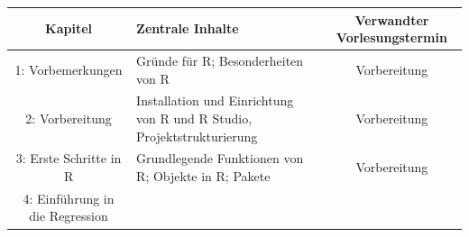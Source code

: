 \documentclass[]{book}
\begin{document}
\begin{longtable}[]{@{}clc@{}}
\toprule
\begin{minipage}[b]{0.10\columnwidth}\centering\strut
Kapitel\strut
\end{minipage} & \begin{minipage}[b]{0.24\columnwidth}\raggedright\strut
Zentrale Inhalte\strut
\end{minipage} & \begin{minipage}[b]{0.38\columnwidth}\centering\strut
Verwandter Vorlesungstermin\strut
\end{minipage}\tabularnewline
\midrule
\endhead
\begin{minipage}[t]{0.10\columnwidth}\centering\strut
1: Vorbemerkungen\strut
\end{minipage} & \begin{minipage}[t]{0.24\columnwidth}\raggedright\strut
Gründe für R; Besonderheiten von R\strut
\end{minipage} & \begin{minipage}[t]{0.38\columnwidth}\centering\strut
Vorbereitung\strut
\end{minipage}\tabularnewline
\begin{minipage}[t]{0.10\columnwidth}\centering\strut
2: Vorbereitung\strut
\end{minipage} & \begin{minipage}[t]{0.24\columnwidth}\raggedright\strut
Installation und Einrichtung von R und R Studio,
Projektstrukturierung\strut
\end{minipage} & \begin{minipage}[t]{0.38\columnwidth}\centering\strut
Vorbereitung\strut
\end{minipage}\tabularnewline
\begin{minipage}[t]{0.10\columnwidth}\centering\strut
3: Erste Schritte in R\strut
\end{minipage} & \begin{minipage}[t]{0.24\columnwidth}\raggedright\strut
Grundlegende Funktionen von R; Objekte in R; Pakete\strut
\end{minipage} & \begin{minipage}[t]{0.38\columnwidth}\centering\strut
Vorbereitung\strut
\end{minipage}\tabularnewline
\begin{minipage}[t]{0.10\columnwidth}\centering\strut
4: Einführung in die Regression\strut
\end{minipage} & \begin{minipage}[t]{0.24\columnwidth}\raggedright\strut

\end{minipage}
\end{longtable}
\end{document}
